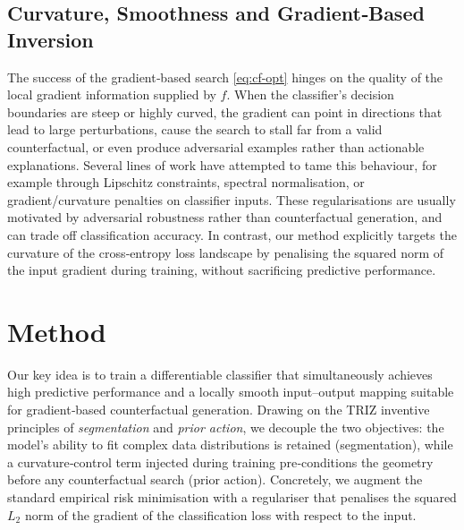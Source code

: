 \documentclass[11pt,a4paper]{article}
\begin{document}
\subsection{Curvature, Smoothness and Gradient‑Based Inversion}
The success of the gradient‑based search \eqref{eq:cf-opt} hinges on the quality of the local gradient information supplied by $f$. When the classifier’s decision boundaries are steep or highly curved, the gradient can point in directions that lead to large perturbations, cause the search to stall far from a valid counterfactual, or even produce adversarial examples rather than actionable explanations. Several lines of work have attempted to tame this behaviour, for example through Lipschitz constraints, spectral normalisation, or gradient/curvature penalties on classifier inputs. These regularisations are usually motivated by adversarial robustness rather than counterfactual generation, and can trade off classification accuracy. In contrast, our method explicitly targets the curvature of the cross‑entropy loss landscape by penalising the squared norm of the input gradient during training, without sacrificing predictive performance.

\section{Method}
\label{sec:method}
Our key idea is to train a differentiable classifier that simultaneously achieves high predictive performance and a locally smooth input–output mapping suitable for gradient‑based counterfactual generation. Drawing on the TRIZ inventive principles of \emph{segmentation} and \emph{prior action}, we decouple the two objectives: the model’s ability to fit complex data distributions is retained (segmentation), while a curvature‑control term injected during training pre‑conditions the geometry before any counterfactual search (prior action). Concretely, we augment the standard empirical risk minimisation with a regulariser that penalises the squared \(L_2\) norm of the gradient of the classification loss with respect to the input.

\end{document}
